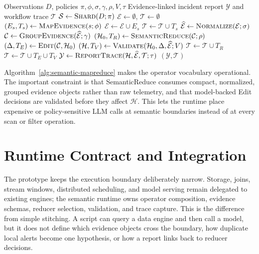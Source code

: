 \documentclass[sigplan,anonymous,nonacm]{acmart}
\newcommand{\systemname}{Semantic MapReduce}
\begin{document}
\begin{algorithm}[t]
\caption{\systemname{} Workflow}
\label{alg:semantic-mapreduce}
\normalsize
\begin{algorithmic}[1]
\Require Observations $D$, policies $\pi,\phi,\sigma,\gamma,\rho,V,\tau$
\Ensure Evidence-linked incident report $\mathcal{Y}$ and workflow trace $\mathcal{T}$
\State $\mathcal{S} \gets \Call{Shard}{D;\pi}$ 
\State $\mathcal{E} \gets \emptyset$, $\mathcal{T} \gets \emptyset$
  \State $(E_s, T_s) \gets \Call{MapEvidence}{s;\phi}$
  \State $\mathcal{E} \gets \mathcal{E} \cup E_s$
  \State $\mathcal{T} \gets \mathcal{T} \cup T_s$
\EndFor
\State $\widehat{\mathcal{E}} \gets \Call{Normalize}{\mathcal{E};\sigma}$
\State $\mathcal{C} \gets \Call{GroupEvidence}{\widehat{\mathcal{E}};\gamma}$
\State $(\mathcal{H}_0, T_R) \gets \Call{SemanticReduce}{\mathcal{C};\rho}$
\State $(\Delta, T_E) \gets \Call{Edit}{\mathcal{C},\mathcal{H}_0}$ 
\State $(\mathcal{H}, T_V) \gets \Call{Validate}{\mathcal{H}_0,\Delta,\widehat{\mathcal{E}};V}$
\State $\mathcal{T} \gets \mathcal{T} \cup T_R$
\State $\mathcal{T} \gets \mathcal{T} \cup T_E \cup T_V$
\State $\mathcal{Y} \gets \Call{ReportTrace}{\mathcal{H}, \widehat{\mathcal{E}}, \mathcal{T};\tau}$
\State \Return $(\mathcal{Y}, \mathcal{T})$
\end{algorithmic}
\end{algorithm}

Algorithm~\ref{alg:semantic-mapreduce} makes the operator vocabulary operational. The important constraint is that \textsf{SemanticReduce} consumes compact, normalized, grouped evidence objects rather than raw telemetry, and that model-backed \textsf{Edit} decisions are validated before they affect $\mathcal{H}$. This lets the runtime place expensive or policy-sensitive LLM calls at semantic boundaries instead of at every scan or filter operation.

\section{Runtime Contract and Integration}

The prototype keeps the execution boundary deliberately narrow. Storage, joins, stream windows, distributed scheduling, and model serving remain delegated to existing engines; the semantic runtime owns operator composition, evidence schemas, reducer selection, validation, and trace capture. This is the difference from simple stitching. A script can query a data engine and then call a model, but it does not define which evidence objects cross the boundary, how duplicate local alerts become one hypothesis, or how a report links back to reducer decisions.
\end{document}
